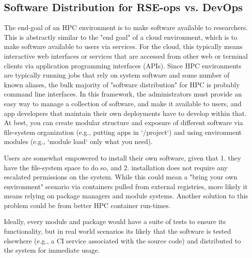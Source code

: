\subsection{Software Distribution for RSE-ops vs. DevOps}

The end-goal of an HPC environment is to make software available to researchers. This is abstractly similar to the "end goal" of a cloud environment, which is to make software available to users via services. For the cloud, this typically means interactive web interfaces or services that are accessed from other web or terminal clients via application programming interfaces (APIs). Since HPC environments are typically running jobs that rely on system software and some number of known aliases, the bulk majority of "software distribution" for HPC is probably command line interfaces. In this framework, the administrators must provide an easy way to manage a collection of software, and make it available to users, and app developers that maintain their own deployments have to develop within that. At best, you can create modular structure and exposure of different software via file-system organization (e.g., putting apps in `/project`) and using environment modules \cite{LMOD,environment-modules,shpc} (e.g., `module load` only what you need).

Users are somewhat empowered to install their own software, given that 1. they have the file-system space to do so, and 2. installation does not require any escalated permissions on the system.
While this could mean a "bring your own environment" scenario via containers pulled from external registries, more likely it means relying on package managers and module systems.
Another solution to this problem could be from better HPC container run-times.

Ideally, every module and package would have a suite of tests to ensure its functionality, but in real world scenarios its likely that the software is tested elsewhere (e.g., a CI service associated with the source code) and distributed to the system for immediate usage.
